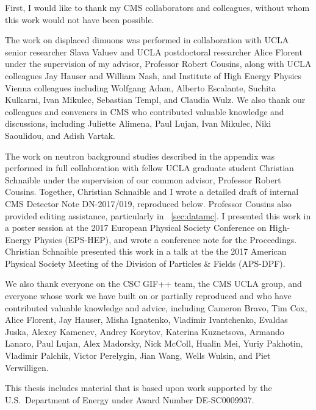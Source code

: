 First, I would like to thank my CMS collaborators and colleagues, without whom this work would not have been possible.

The work on displaced dimuons was performed in collaboration with UCLA senior researcher Slava Valuev and UCLA postdoctoral researcher Alice Florent under the supervision of my advisor, Professor Robert Cousins, along with UCLA colleagues Jay Hauser and William Nash, and Institute of High Energy Physics Vienna colleagues including Wolfgang Adam, Alberto Escalante, Suchita Kulkarni, Ivan Mikulec, Sebastian Templ, and Claudia Wulz.
We also thank our colleagues and conveners in CMS who contributed valuable knowledge and discussions, including Juliette Alimena, Paul Lujan, Ivan Mikulec, Niki Saoulidou, and Adish Vartak.

The work on neutron background studies described in the appendix was performed in full collaboration with fellow UCLA graduate student Christian Schnaible under the supervision of our common advisor, Professor Robert Cousins.
Together, Christian Schnaible and I wrote a detailed draft of internal CMS Detector Note DN-2017/019, reproduced below.
Professor Cousins also provided editing assistance, particularly in \Sec~\ref{sec:datamc}.
I presented this work in a poster session at the 2017 European Physical Society Conference on High-Energy Physics (EPS-HEP), and wrote a conference note for the Proceedings.
Christian Schnaible presented this work in a talk at the the 2017 American Physical Society Meeting of the Division of Particles \& Fields (APS-DPF).

We also thank everyone on the CSC GIF++ team, the CMS UCLA group, and everyone whose work we have built on or partially reproduced and who have contributed valuable knowledge and advice, including Cameron Bravo, Tim Cox, Alice Florent, Jay Hauser, Misha Ignatenko, Vladimir Ivantchenko, Evaldas Juska, Alexey Kamenev, Andrey Korytov, Katerina Kuznetsova, Armando Lanaro, Paul Lujan, Alex Madorsky, Nick McColl, Hualin Mei, Yuriy Pakhotin, Vladimir Palchik, Victor Perelygin, Jian Wang, Wells Wulsin, and Piet Verwilligen.

This thesis includes material that is based upon work supported by the U.S.\ Department of Energy under Award Number {DE}-{SC}0009937.
